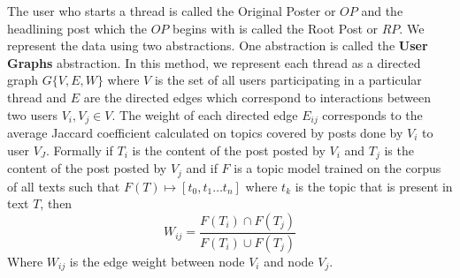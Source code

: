 The user who starts a thread is called the Original Poster or $OP$ and the headlining post which the $OP$ begins with is called the Root Post or $RP$. We represent the data using two abstractions. One abstraction is called the \textbf{User Graphs} abstraction. In this method, we represent each thread as a directed graph $G\{V,E,W\}$ where $V$ is the set of all users participating in a particular thread and $E$ are the directed  edges which correspond to interactions between two users $V_i , V_j  \in V$. The weight of each directed edge $E_{ij}$ corresponds to the average Jaccard coefficient calculated on topics covered by posts done by $V_i$ to user $V_J$. 
Formally if $T_i$ is the content of the post posted by $V_i$ and $T_j$ is the content of the post posted by $V_j$ and if $F$ is a topic model trained on the corpus of all texts such that $F(T) \mapsto [t_0 , t_1 \ldots t_n ]$ where $t_k$ is the topic that is present in text $T$, then 
\begin{equation}
	W_{ij} = \frac{F(T_i) \cap F(T_j)}{F(T_i) \cup F(T_j)}
\end{equation}
Where $W_{ij}$ is the edge weight between node $V_i$ and node $V_j$.

